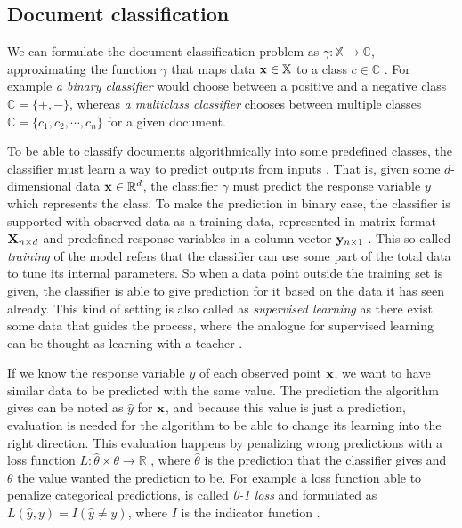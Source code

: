 \subsection{Document classification} \label{chap-bg-classification}

We can formulate the document classification problem as $\gamma: \mathbb{X} \rightarrow \mathbb{C}$, approximating the function $\gamma$ that maps data $\mathbf{x} \in \mathbb{X}$ to a class $c \in \mathbb{C}$  \cite{Manning:2008:IIR:1394399}. For example \emph{a binary classifier} would choose between a positive and a negative class $\mathbb{C} = \{+, -\}$, whereas \emph{a multiclass classifier} chooses between multiple classes $\mathbb{C} = \{c_1, c_2, \cdots, c_n\}$ for a given document.

To be able to classify documents algorithmically into some predefined classes, the classifier must learn a way to predict outputs from inputs \cite{hastie_09_elements-of.statistical-learning}. That is, given some $d$-dimensional data $\mathbf{x} \in \mathbb{R}^d$, the classifier $\gamma$ must predict the response variable $y$ which represents the class. To make the prediction in binary case, the classifier is supported with observed data as a training data, represented in matrix format $\mathbf{X}_{n \times d}$ and predefined response variables in a column vector $\mathbf{y}_{n \times 1}$ \cite{hastie_09_elements-of.statistical-learning}. This so called \emph{training} of the model refers that the classifier can use some part of the total data to tune its internal parameters. So when a data point outside the training set is given, the classifier is able to give prediction for it based on the data it has seen already. This kind of setting is also called as \emph{supervised learning} as there exist some data that guides the process, where the analogue for supervised learning can be thought as learning with a teacher \cite{hastie_09_elements-of.statistical-learning}.

If we know the response variable $y$ of each observed point $\mathbf{x}$, we want to have similar data to be predicted with the same value. The prediction the algorithm gives can be noted as $\hat{y}$ for $\mathbf{x}$, and because this value is just a prediction, evaluation is needed for the algorithm to be able to change its learning into the right direction. This evaluation happens by penalizing wrong predictions with a loss function $L: \hat{\theta} \times \theta \rightarrow \mathbb{R}$ \cite{hastie_09_elements-of.statistical-learning}, where $\hat{\theta}$ is the prediction that the classifier gives and $\theta$ the value wanted the prediction to be. For example a loss function able to penalize categorical predictions, is called \emph{0-1 loss} and formulated as $L(\hat{y}, y) = I(\hat{y} \neq y)$, where $I$ is the indicator function \cite{hastie_09_elements-of.statistical-learning}. 


